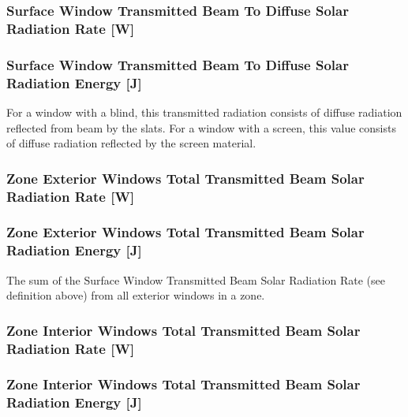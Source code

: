 \subsubsection{Surface Window Transmitted Beam To Diffuse Solar Radiation Rate {[}W{]}}\label{surface-window-transmitted-beam-to-diffuse-solar-radiation-rate-w}

\subsubsection{Surface Window Transmitted Beam To Diffuse Solar Radiation Energy {[}J{]}}\label{surface-window-transmitted-beam-to-diffuse-solar-radiation-energy-j}

For a window with a blind, this transmitted radiation consists of diffuse radiation reflected from beam by the slats. For a window with a screen, this value consists of diffuse radiation reflected by the screen material.

\subsubsection{Zone Exterior Windows Total Transmitted Beam Solar Radiation Rate {[}W{]}}\label{zone-exterior-windows-total-transmitted-beam-solar-radiation-rate-w}

\subsubsection{Zone Exterior Windows Total Transmitted Beam Solar Radiation Energy {[}J{]}}\label{zone-exterior-windows-total-transmitted-beam-solar-radiation-energy-j}

The sum of the Surface Window Transmitted Beam Solar Radiation Rate (see definition above) from all exterior windows in a zone.

\subsubsection{Zone Interior Windows Total Transmitted Beam Solar Radiation Rate {[}W{]}}\label{zone-interior-windows-total-transmitted-beam-solar-radiation-rate-w}

\subsubsection{Zone Interior Windows Total Transmitted Beam Solar Radiation Energy {[}J{]}}\label{zone-interior-windows-total-transmitted-beam-solar-radiation-energy-j}

